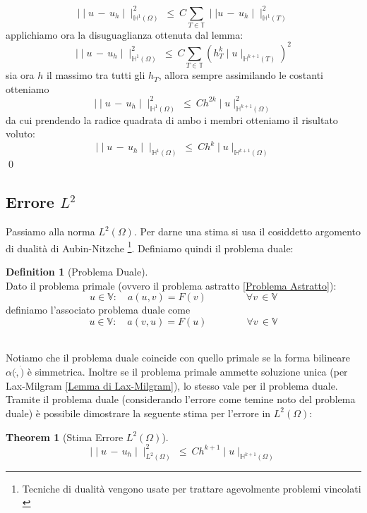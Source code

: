 \documentclass[12pt,a4paper]{report}
\theoremstyle{theorem}
\newtheorem{theorem}{Theorem}[section]
\theoremstyle{theorem}
\theoremstyle{definition}
\newtheorem{definition}{Definition}[section]
\begin{document}
\[ \mid \mid u \, - \, u_{h} \mid \mid_{\mathbb{H}^{1}(\Omega)}^{2} \ \leq \ C \sum_{T \in \mathbb{T}} \mid \mid u \, - \, u_{h} \mid \mid_{\mathbb{H}^{1}(T)}^2 \]
applichiamo ora la disuguaglianza ottenuta dal lemma:
\[ \mid \mid u \, - \, u_{h} \mid \mid_{\mathbb{H}^{1}(\Omega)}^{2} \ \leq \ C \sum_{T \in \mathbb{T}} (h_{T}^{k} \mid u \mid_{\mathbb{H}^{k+1}(T)})^2 \]
sia ora $h$ il massimo tra tutti gli $h_{T}$, allora sempre assimilando le costanti otteniamo
\[ \mid \mid u \, - \, u_{h} \mid \mid_{\mathbb{H}^{1}(\Omega)}^{2} \ \leq \ C h^{2k} \mid u \mid_{\mathbb{H}^{k+1}(\Omega)}^2 \]
da cui prendendo la radice quadrata di ambo i membri otteniamo il risultato voluto:
\[ \mid \mid u \, - \, u_{h} \mid \mid_{\mathbb{H}^{1}(\Omega)} \ \leq \ C h^{k} \mid u \mid_{\mathbb{H}^{k+1}(\Omega)} \]
\qed
\hfill


\subsection{Errore $L^{2}$}
Passiamo alla norma $L^{2}(\Omega)$. Per darne una stima si usa il cosiddetto argomento di dualità di Aubin-Nitzche \footnote{Tecniche di dualità vengono usate per trattare agevolmente problemi vincolati \cite{BBFmixed}}. Definiamo quindi il problema duale:
\begin{definition} [Problema Duale] \label{Problema Duale} 
\hfill \\
Dato il problema primale (ovvero il problema astratto \ref{Problema Astratto}):
\[ u \in  \mathbb{V} : \quad a(u,v) = F(v) \qquad \qquad \forall v \, \in \mathbb{V} \]
definiamo l'associato problema duale come
\[ u \in  \mathbb{V} : \quad a(v,u) = F(u) \qquad \qquad \forall v \, \in \mathbb{V} \]
\end{definition} 
\hfill \\
Notiamo che il problema duale coincide con quello primale se la forma bilineare $\alpha (\dot , \dot)$ è simmetrica. Inoltre se il problema primale ammette soluzione unica (per Lax-Milgram \ref{Lemma di Lax-Milgram}), lo stesso vale per il problema duale. Tramite il problema duale (considerando l'errore come temine noto del problema duale) è possibile dimostrare la seguente stima per l'errore in $L^{2}(\Omega)$:
\begin{theorem} [Stima Errore $L^2(\Omega)$] \label{Stima Errore L2} 
\[ \mid \mid u \, - \, u_{h} \mid \mid_{L^{2}(\Omega)}^{2} \ \leq \ C h^{k+1} \mid u \mid_{\mathbb{H}^{k+1}(\Omega)} \]
\end{theorem}
\end{document}
